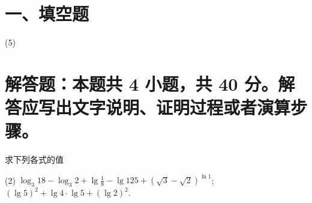 \documentclass{exam-zh}
\begin{document}
\section*{一、填空题}
\begin{tasks}[label=\arabic*.](5)
  \task \underline{\hspace{2cm}}
  \task \underline{\hspace{2cm}}
  \task \underline{\hspace{2cm}}
  \task \underline{\hspace{2cm}}
  \task \underline{\hspace{2cm}}
  \task \underline{\hspace{2cm}}
  \task \underline{\hspace{2cm}}
  \task \underline{\hspace{2cm}}
  \task \underline{\hspace{2cm}}
  \task \underline{\hspace{2cm}}
\end{tasks}  



\clearpage









\section{解答题：本题共 4 小题，共 40 分。解答应写出文字说明、证明过程或者演算步骤。}




        \begin{problem}[points = 10]
          求下列各式的值

          \begin{tasks}[label=(\arabic*)](2)
              \task $\log_{3} 18 - \log_3 2 + \lg \frac{1}{8} - \lg 125 +(\sqrt{3} -\sqrt{2})^{\ln 1}$;
              \task $\left(\lg5\right)^{2}+\lg4\cdot\lg5+\left(\lg2\right)^{2}$.
          \end{tasks}
        \end{problem}
\end{document}
